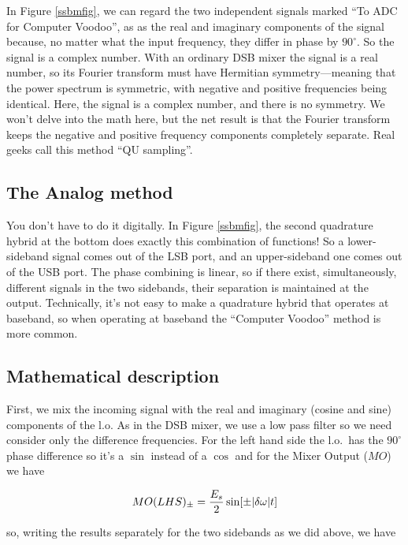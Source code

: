 \documentclass[11pt,preprint]{aastex}
\begin{document}
In Figure \ref{ssbmfig}, we can regard the two independent signals
marked ``To ADC for Computer Voodoo'', as as the real and imaginary
components of the signal because, no matter what the input frequency,
they differ in phase by $90^\circ$. So the signal is a complex
number. With an ordinary DSB mixer the signal is a real number, so its
Fourier transform must have Hermitian symmetry---meaning that the power
spectrum is symmetric, with negative and positive frequencies being
identical. Here, the signal is a complex number, and there is no
symmetry. We won't delve into the math here, but the net result is that
the Fourier transform keeps the negative and positive frequency
components completely separate. Real geeks call this method ``QU
sampling''. 

\subsection{The Analog method}

You don't have to do it digitally. In Figure \ref{ssbmfig}, the second
quadrature hybrid at the bottom does exactly this combination of
functions! So a lower-sideband signal comes out of the LSB port, and an
upper-sideband one comes out of the USB port. The phase combining is
linear, so if there exist, simultaneously, different signals in the two
sidebands, their separation is maintained at the output. Technically,
it's not easy to make a quadrature hybrid that operates at baseband, so
when operating at baseband the ``Computer Voodoo'' method is more
common. 



\subsection{Mathematical description} \label{mathdescr}

        First, we mix the incoming signal with the real and imaginary
(cosine and sine) components of the l.o. As in the DSB mixer, we use a
low pass filter so we need consider only the difference frequencies. For
the left hand side the l.o.\ has the $90^\circ$ phase difference so it's
a $\sin$ instead of a $\cos$ and for the Mixer Output ($MO$) we have

\begin{equation}
MO(LHS)_\pm = {E_s \over 2} \sin [\pm|\delta \omega | t]
\end{equation}

\noindent so, writing the results separately for the two sidebands as we
did above, we have
\end{document}
